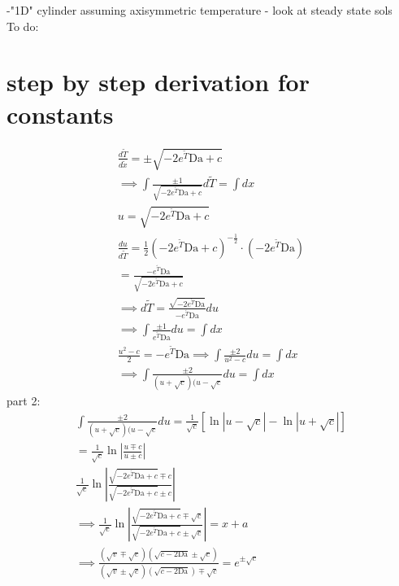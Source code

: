 \documentclass[12pt]{article}
\newcommand{\twoeda}{-2e^{\tilde{T}}\text{Da}}
\newcommand{\eda}{e^{\tilde{T}}\text{Da}}
\newcommand{\da}{\text{Da}}
\begin{document}
-"1D" cylinder assuming axisymmetric temperature - look at steady state sols\\


To do:


\section{step by step derivation for constants}
\begin{equation}
    \begin{split}
         \frac{d\tilde{T}}{d\tilde{x}} = \pm \sqrt{\twoeda + c}
         \\\implies \int\frac{\pm1}{\sqrt{\twoeda + c}}d\tilde{T} = \int dx
         \\ u = \sqrt{\twoeda + c}
         \\ \frac{du}{d\tilde{T}} = \frac{1}{2}\left (\twoeda + c\right) ^ {-\frac{1}{2}}\cdot \left(\twoeda\right)
         \\ =\frac{-e^{\tilde{T}}\text{Da}}{\sqrt{\twoeda + c}} 
         \\ \implies d\tilde{T} = \frac{\sqrt{\twoeda}}{-e^{\tilde{T}}\text{Da}}du
         \\ \implies \int \frac{\pm 1}{e^{\tilde{T}}\text{Da}}du = \int dx
         \\ \frac{u^2 - c}{2} = -e^{\tilde{T}}\text{Da}
         \implies \int \frac{\pm 2}{u^2 - c}du = \int dx
         \\ \implies \int \frac{\pm 2}{(u + \sqrt{c})(u - \sqrt{c}}du = \int dx
    \end{split}
\end{equation}
part 2: 
\begin{equation}
    \begin{split}
         \int \frac{\pm 2}{(u + \sqrt{c})(u - \sqrt{c}}du = \frac{1}{\sqrt{c}}\left[\ln{|u - \sqrt{c}| - \ln|u + \sqrt{c}|} \right]\\ = \frac{1}{\sqrt{c}}\ln\left|\frac{u \mp c}{u \pm c} \right|
        \\ \frac{1}{\sqrt{c}}\ln\left|\frac{\sqrt{\twoeda + c} \mp c}{\sqrt{\twoeda + c} \pm c} \right|
        \\\implies \frac{1}{\sqrt{c}}\ln\left|\frac{\sqrt{\twoeda + c} \mp \sqrt{c}}{\sqrt{\twoeda + c} \pm \sqrt{c}} \right| = x + a
        \\ \implies \frac{(\sqrt{v}\mp \sqrt{c})(\sqrt{c - 2\da}\pm \sqrt{c})}{(\sqrt{v}\pm \sqrt{c})(\sqrt{c - 2\da}) \mp \sqrt{c}} = e^{\pm \sqrt{c}}
    \end{split}
\end{equation}
\end{document}
